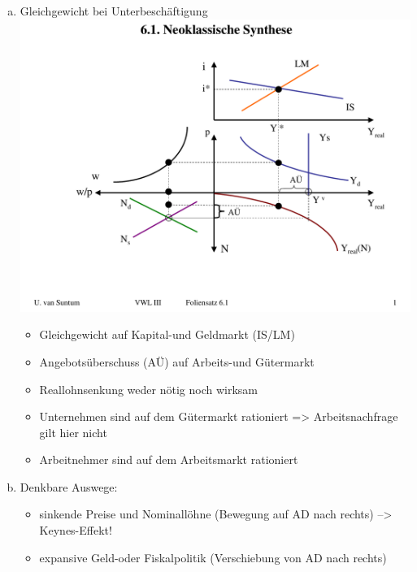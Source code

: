 \documentclass{scrartcl}
\begin{document}
\begin{enumerate}[(a)]
\item Gleichgewicht bei Unterbesch\"{a}ftigung\\
\includegraphics[width=\textwidth]{Bilder/Neoklassische_Synthese_Unterbeschaftigung.pdf}\\
\begin{itemize}
  \item Gleichgewicht auf Kapital-und Geldmarkt (IS/LM)
  \item Angebots\"{u}berschuss (A\"{U}) auf Arbeits-und G\"{u}termarkt
  \item Reallohnsenkung weder n\"{o}tig noch wirksam
  \item Unternehmen sind auf dem G\"{u}termarkt rationiert => Arbeitsnachfrage gilt hier nicht
  \item Arbeitnehmer sind auf dem Arbeitsmarkt rationiert
\end{itemize}
\item Denkbare Auswege:
\begin{itemize}
\item sinkende Preise und Nominall\"{o}hne (Bewegung auf AD nach rechts) --> Keynes-Effekt!
\item expansive Geld-oder Fiskalpolitik (Verschiebung von AD nach rechts)
\end{itemize}


\end{enumerate}
\end{document}

